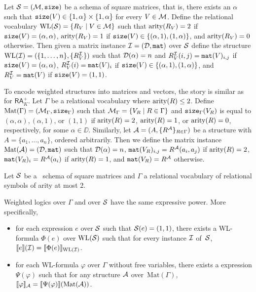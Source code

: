 Let $\mathcal{S}=(\mathcal{M},\texttt{size})$ be a schema of square matrices, that is, there exists an $\alpha$ such that $\texttt{size}(V) \in \{1, \alpha\} \times \{1,\alpha\}$ for every $V \in \mathcal{M}$.
Define the relational vocabulary $\text{WL}(\mathcal{S}) = \{R_V \mid V \in \mathcal{M}\}$ such that $\operatorname{arity}(R_V) = 2$ if $\texttt{size}(V) = (\alpha, \alpha)$, $\operatorname{arity}(R_V) = 1$ if $\texttt{size}(V) \in \{(\alpha,1), (1,\alpha)\}$, and $\operatorname{arity}(R_V) = 0$ otherwise.
Then given a matrix instance $\mathcal{I} = (\mathcal{D},\texttt{mat})$ over $\mathcal{S}$ define the structure $\text{WL}(\mathcal{I}) = (\{1, \ldots, n\}, \{R_V^{\mathcal{I}}\} )$ such that $\mathcal{D}(\alpha) = n$ and $R_V^{\mathcal{I}}(i, j) = \texttt{mat}(V)_{i,j}$ if $\texttt{size}(V) = (\alpha, \alpha)$, $R_V^{\mathcal{I}}(i) = \texttt{mat}(V)_{i}$ if $\texttt{size}(V) \in \{(\alpha,1), (1,\alpha)\}$, and $R_V^{\mathcal{I}} = \texttt{mat}(V)$ if $\texttt{size}(V) = (1,1)$.

To encode weighted structures into matrices and vectors, the story is similar as for $\mathsf{RA}_K^+$. Let $\Gamma$ be a relational vocabulary where $\operatorname{arity}(R) \leq 2$. 
Define $\text{Mat}(\Gamma) = (\mathcal{M}_\Gamma,\texttt{size}_\Gamma)$ such that $\mathcal{M}_\Gamma = \{ V_{R} \mid R \in \Gamma\}$ and $\texttt{size}_\Gamma(V_{R})$ is equal to $(\alpha, \alpha), (\alpha, 1)$, or $(1,1)$ if $\operatorname{arity}(R)=2$, $\operatorname{arity}(R)=1$, or $\operatorname{arity}(R)=0$, respectively, for some $\alpha \in \DD$. Similarly, let $\mathcal{A} = (A, \{R^{\mathcal{A}}\}_{R \in \Gamma})$ be a structure with $A = \{a_1, \ldots, a_n\}$, ordered arbitrarily.
Then we define the matrix instance $\text{Mat}(\mathcal{A}) = (\mathcal{D},\texttt{mat})$ such that $\mathcal{D}(\alpha) = n$, $\texttt{mat}(V_{R})_{i,j} = R^{\mathcal{A}}(a_i, a_j)$ if $\operatorname{arity}(R)=2$, $\texttt{mat}(V_{R})_{i} = R^{\mathcal{A}}(a_i)$ if $\operatorname{arity}(R)=1$, and $\texttt{mat}(V_{R}) = R^{\mathcal{A}}$ otherwise.

Let $\mathcal{S}$ be a \lang\ schema of square matrices and $\Gamma$ a relational vocabulary of relational symbols of arity at most $2$. 
\begin{proposition}
Weighted logics over $\Gamma$ and \langprod over $\mathcal{S}$ have the same expressive power. More specifically,
\begin{itemize}
	\item for each \langprod expression $e$ over $\mathcal{S}$ such that $\mathcal{S}(e)=(1,1)$, there exists a WL-formula $\Phi(e)$ over $\text{WL}(\mathcal{S})$ such that for every instance $\mathcal{I}$ of~$\mathcal{S}$, 
	$
	\llbracket e \rrbracket(\mathcal{I}) = \llbracket \Phi(e) \rrbracket_{\text{WL}(\mathcal{I})}
	$.
	\item for each WL-formula $\varphi$ over $\Gamma$ without free variables, there exists a \langprod expression $\Psi(\varphi)$ such that for any structure $\mathcal{A}$ over~$\text{Mat}(\Gamma)$,
	$
	\llbracket \varphi \rrbracket_{\mathcal{A}}=\llbracket \Psi(\varphi) \rrbracket(\text{Mat}(\mathcal{A}))
	$.
\end{itemize}	
\end{proposition}

